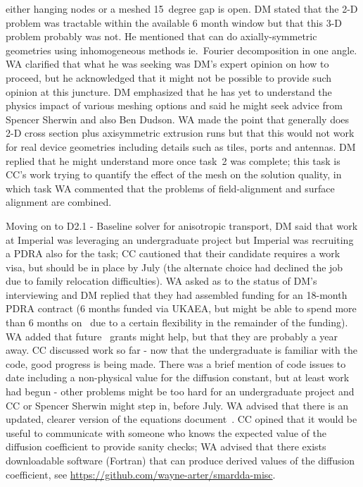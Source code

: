 either hanging nodes or a meshed 15~degree gap is open.  DM stated that the 2-D 
problem was tractable within the available 6 month window but that this 3-D 
problem probably was not.  He mentioned that  can do 
axially-symmetric geometries using inhomogeneous methods ie.\ Fourier 
decomposition in one angle.  WA clarified that what he was seeking was DM's expert opinion 
on how to proceed, but he acknowledged that it might not be possible to provide 
such opinion at this juncture.  DM emphasized that he has yet to understand the 
physics impact of various meshing options and said he might seek advice from 
Spencer Sherwin and also Ben Dudson.  WA made the point that  
generally does 2-D cross section plus axisymmetric extrusion runs but that this 
would not work for real device geometries including details such as tiles, 
ports and antennas.  DM replied that he might understand more once task~2 was 
complete; this task is CC's work trying to quantify the effect of the mesh on 
the solution quality, in which task WA commented that the problems of 
field-alignment and surface alignment are combined.

Moving on to D2.1 - Baseline solver for anisotropic transport, DM said that 
work at Imperial was leveraging an undergraduate project but Imperial was 
recruiting a PDRA also for the task; CC cautioned that their candidate requires 
a work visa, but should be in place by July (the alternate choice had declined 
the job due to family relocation difficulties).  WA asked as to the status of 
DM's interviewing and DM replied that they had assembled funding for an 
18-month PDRA contract (6 months funded via UKAEA, but might be able to spend 
more than 6 months on \nep\  due to a certain flexibility in the remainder of 
the funding).  WA added that future \nep\  grants might help, but that they 
are probably a year away.  CC discussed work so far - now that the 
undergraduate is familiar with the code, good progress is being made.  There 
was a brief mention of code issues to date including a non-physical value for 
the diffusion constant, but at least work had begun - other problems might be 
too hard for an undergraduate project and CC or Spencer Sherwin might step in, 
before July.  WA advised that there is an updated, clearer version of the 
equations document~\cite{pappeqs}.  CC opined that it would be useful to communicate with 
someone who knows the expected value of the diffusion coefficient to provide 
sanity checks; WA advised that there exists downloadable software (Fortran) 
that can produce derived values of the diffusion coefficient,
see \url{https://github.com/wayne-arter/smardda-misc}.

